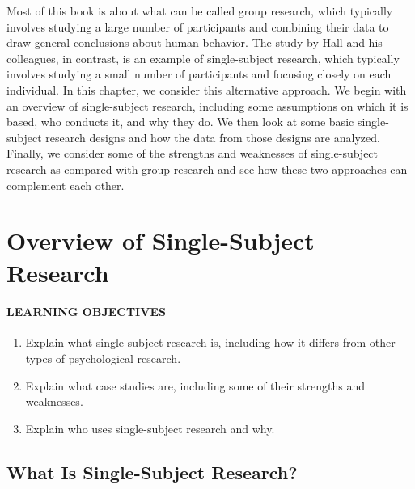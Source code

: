 \documentclass[
]{krantz}
\providecommand{\tightlist}{%
  \setlength{\itemsep}{0pt}\setlength{\parskip}{0pt}}
\begin{document}
Most of this book is about what can be called group research, which typically involves studying a large number of participants and combining their data to draw general conclusions about human behavior. The study by Hall and his colleagues, in contrast, is an example of single-subject research, which typically involves studying a small number of participants and focusing closely on each individual. In this chapter, we consider this alternative approach. We begin with an overview of single-subject research, including some assumptions on which it is based, who conducts it, and why they do. We then look at some basic single-subject research designs and how the data from those designs are analyzed. Finally, we consider some of the strengths and weaknesses of single-subject research as compared with group research and see how these two approaches can complement each other.

\hypertarget{overview-of-single-subject-research}{%
\section{Overview of Single-Subject Research}\label{overview-of-single-subject-research}}

\hypertarget{learning-objectives-27}{%
\paragraph*{LEARNING OBJECTIVES}\label{learning-objectives-27}}

\begin{enumerate}
\def\labelenumi{\arabic{enumi}.}
\tightlist
\item
  Explain what single-subject research is, including how it differs from other types of psychological research.
\item
  Explain what case studies are, including some of their strengths and weaknesses.
\item
  Explain who uses single-subject research and why.
\end{enumerate}

\hypertarget{what-is-single-subject-research}{%
\subsection*{What Is Single-Subject Research?}\label{what-is-single-subject-research}}
\end{document}
